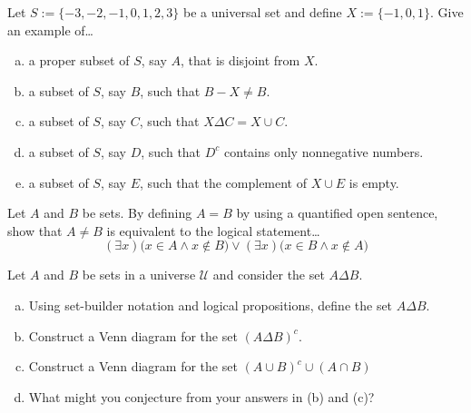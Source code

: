 \documentclass[11pt,letterpaper]{article}
\begin{document}

 Let $S:= \{ -3, -2, -1, 0, 1, 2, 3 \}$ be a universal set and define $X:= \{ -1, 0, 1 \}$. Give an example of\dots
	\begin{enumerate}[(a)]
	\item a proper subset of $S$, say $A$, that is disjoint from $X$.
	\item a subset of $S$, say $B$, such that $B - X \neq B$.
	\item a subset of $S$, say $C$, such that $X \Delta C= X \cup C$.
	\item a subset of $S$, say $D$, such that $D^c$ contains only nonnegative numbers.
	\item a subset of $S$, say $E$, such that the complement of $X \cup E$ is empty. 
	\end{enumerate}



\newpage



 Let $A$ and $B$ be sets. By defining $A= B$ by using a quantified open sentence, show that $A \neq B$ is equivalent to the logical statement\dots
	\[
	(\exists x) \big( x \in A \wedge x \notin B \big) \vee (\exists x) \big( x \in B \wedge x \notin A \big)
	\]



\newpage



 Let $A$ and $B$ be sets in a universe $\mathcal{U}$ and consider the set $A \Delta B$. 
	\begin{enumerate}[(a)]
	\item Using set-builder notation and logical propositions, define the set $A \Delta B$.
	\item Construct a Venn diagram for the set $(A \Delta B)^c$.
	\item Construct a Venn diagram for the set $(A \cup B)^c \cup (A \cap B)$
	\item What might you conjecture from your answers in (b) and (c)?
	\end{enumerate}



\newpage
\end{document}
